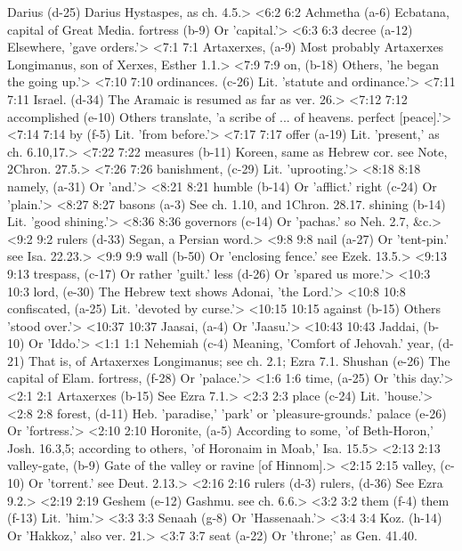   Darius (d-25)  Darius Hystaspes, as ch. 4.5.>
<6:2 6:2  Achmetha (a-6)  Ecbatana, capital of Great Media.
  fortress (b-9)  Or 'capital.'>
<6:3 6:3  decree (a-12)  Elsewhere, 'gave orders.'>
<7:1 7:1  Artaxerxes, (a-9)  Most probably Artaxerxes Longimanus, son of Xerxes, Esther 1.1.>
<7:9 7:9  on, (b-18)  Others, 'he began the going up.'>
<7:10 7:10  ordinances. (c-26)  Lit. 'statute and ordinance.'>
<7:11 7:11  Israel. (d-34)  The Aramaic is resumed as far as ver. 26.>
<7:12 7:12  accomplished (e-10)  Others translate, 'a scribe of ... of heavens. perfect  [peace].'>
<7:14 7:14  by (f-5)  Lit. 'from before.'>
<7:17 7:17  offer (a-19)  Lit. 'present,' as ch. 6.10,17.>
<7:22 7:22  measures (b-11)  Koreen, same as Hebrew cor. see Note, 2Chron. 27.5.>
<7:26 7:26  banishment, (c-29)  Lit. 'uprooting.'>
<8:18 8:18  namely, (a-31)  Or 'and.'>
<8:21 8:21  humble (b-14)  Or 'afflict.'
  right (c-24)  Or 'plain.'>
<8:27 8:27  basons (a-3)  See ch. 1.10, and 1Chron. 28.17.
  shining (b-14)  Lit. 'good shining.'>
<8:36 8:36  governors (c-14)  Or 'pachas.' so Neh. 2.7, &c.>
<9:2 9:2  rulers (d-33)  Segan, a Persian word.>
<9:8 9:8  nail (a-27)  Or 'tent-pin.' see Isa. 22.23.>
<9:9 9:9  wall (b-50)  Or 'enclosing fence.' see Ezek. 13.5.>
<9:13 9:13  trespass, (c-17)  Or rather 'guilt.'
  less (d-26)  Or 'spared us more.'>
<10:3 10:3  lord, (e-30)  The Hebrew text shows Adonai, 'the Lord.'>
<10:8 10:8  confiscated, (a-25)  Lit. 'devoted by curse.'>
<10:15 10:15  against (b-15)  Others 'stood over.'>
<10:37 10:37  Jaasai, (a-4)  Or 'Jaasu.'>
<10:43 10:43  Jaddai, (b-10)  Or 'Iddo.'>
<1:1 1:1  Nehemiah (c-4)  Meaning, 'Comfort of Jehovah.'
  year, (d-21)  That is, of Artaxerxes Longimanus; see ch. 2.1; Ezra 7.1.
  Shushan (e-26)  The capital of Elam.
  fortress, (f-28)  Or 'palace.'>
<1:6 1:6  time, (a-25)  Or 'this day.'>
<2:1 2:1  Artaxerxes (b-15)  See Ezra 7.1.>
<2:3 2:3  place (c-24)  Lit. 'house.'>
<2:8 2:8  forest, (d-11)  Heb. 'paradise,' 'park' or 'pleasure-grounds.'
  palace (e-26)  Or 'fortress.'>
<2:10 2:10  Horonite, (a-5)  According to some, 'of Beth-Horon,' Josh. 16.3,5; according  to others, 'of Horonaim in Moab,' Isa. 15.5>
<2:13 2:13  valley-gate, (b-9)  Gate of the valley or ravine [of Hinnom].>
<2:15 2:15  valley, (c-10)  Or 'torrent.' see Deut. 2.13.>
<2:16 2:16  rulers (d-3)  rulers, (d-36)
  See Ezra 9.2.>
<2:19 2:19  Geshem (e-12)  Gashmu. see ch. 6.6.>
<3:2 3:2  them (f-4)  them (f-13)
  Lit. 'him.'>
<3:3 3:3  Senaah (g-8)  Or 'Hassenaah.'>
<3:4 3:4  Koz. (h-14)  Or 'Hakkoz,' also ver. 21.>
<3:7 3:7  seat (a-22)  Or 'throne;' as Gen. 41.40.
